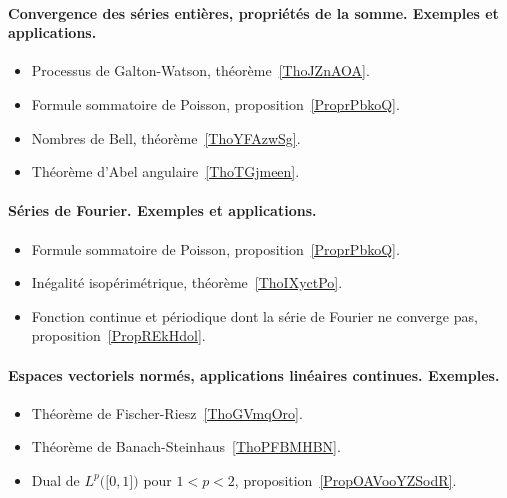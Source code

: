 \paragraph{Convergence des séries entières, propriétés de la somme. Exemples et applications.}
\begin{itemize}
    \item Processus de Galton-Watson, théorème~\ref{ThoJZnAOA}.
    \item Formule sommatoire de Poisson, proposition~\ref{ProprPbkoQ}.
    \item Nombres de Bell, théorème~\ref{ThoYFAzwSg}.
    \item Théorème d'Abel angulaire~\ref{ThoTGjmeen}.
\end{itemize}
\paragraph{Séries de Fourier. Exemples et applications.}
\begin{itemize}
    \item Formule sommatoire de Poisson, proposition~\ref{ProprPbkoQ}.
    \item Inégalité isopérimétrique, théorème~\ref{ThoIXyctPo}.
    \item Fonction continue et périodique dont la série de Fourier ne converge pas, proposition~\ref{PropREkHdol}.
\end{itemize}
\paragraph{Espaces vectoriels normés, applications linéaires continues. Exemples.}
\begin{itemize}
    \item Théorème de Fischer-Riesz~\ref{ThoGVmqOro}.
    \item Théorème de Banach-Steinhaus~\ref{ThoPFBMHBN}.
    \item Dual de \( L^p\big( \mathopen[ 0 , 1 \mathclose] \big)\) pour \( 1<p<2\), proposition~\ref{PropOAVooYZSodR}.
\end{itemize}

